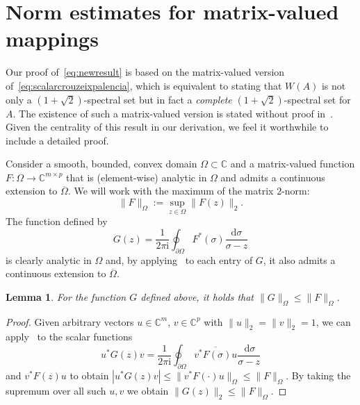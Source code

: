\documentclass[11pt,a4paper]{amsart}
\newtheorem{lemma}[theorem]{Lemma}
\newcommand{\C}{{\mathbb C}}
\begin{document}
\section{Norm estimates for matrix-valued mappings}

Our proof of~\eqref{eq:newresult} is based on the matrix-valued version of~\eqref{eq:scalarcrouzeixpalencia}, which is equivalent to stating that $W(A)$ is not only a $(1+\sqrt{2})$-spectral set but in fact a \emph{complete} $(1+\sqrt{2})$-spectral set for $A$. The existence of such a matrix-valued version is stated without proof in~\cite{CrouzeixPalencia2017}. Given the centrality of this result in our derivation, we feel it worthwhile to include a detailed proof.

Consider a smooth, bounded, convex domain $\Omega \subset \mathbb C$ and a matrix-valued function $F: \Omega \to \C^{m\times p}$ that is (element-wise) analytic in $\Omega$ and admits a continuous extension to $\overline{\Omega}$.
We will work with the maximum of the matrix $2$-norm:
\[
 \|F\|_\Omega := \sup_{z \in \Omega} \| F(z) \|_2.
\]
The function defined by
\[
 G(z) = \frac{1}{2\pi \mathrm{i}} \oint_{\partial \Omega} F^*(\sigma) \frac{\mathrm{d}\sigma}{\sigma-z}
\]
is clearly analytic in $\Omega$ and, by applying~\cite[Lemma 2.1]{CrouzeixPalencia2017} to each entry of $G$, it also admits a continuous extension to $\overline{\Omega}$.
\begin{lemma} \label{lemma:1}
 For the function $G$ defined above, it holds that $\|G\|_\Omega \le \|F\|_\Omega$.
\end{lemma}
\begin{proof}
Given arbitrary vectors $u\in \C^m$, $v\in \C^p$ with $\|u\|_2 = \|v\|_2 = 1$, we can apply~\cite[Lemma 2.1]{CrouzeixPalencia2017} to the scalar functions \[
u^* G(z) v = \frac{1}{2\pi \mathrm{i}} \oint_{\partial \Omega} \overline{v^* F(\sigma) u} \frac{\,\mathrm{d}\sigma}{\sigma-z}
\]
and $v^* F(z) u$ to obtain $|u^* G(z) v| \le \| v^* F(\cdot) u \|_\Omega \le \|F\|_\Omega$. By taking the supremum over all such $u,v$ we obtain
$\|G(z)\|_2 \le \|F\|_\Omega$.
\end{proof}
\end{document}
